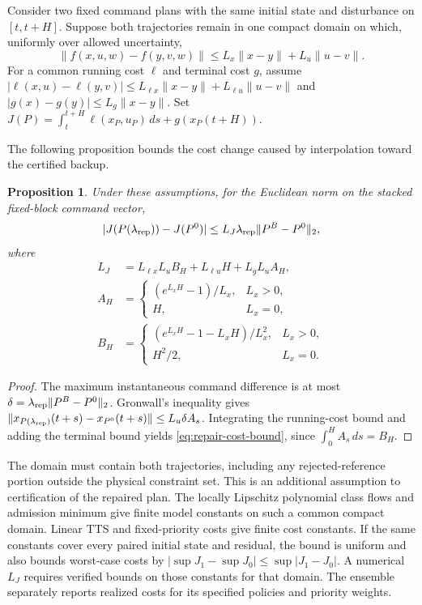 \documentclass[preprint,12pt]{elsarticle}
\newtheorem{proposition}{Proposition}
\begin{document}
Consider two fixed command plans with the same initial state and
disturbance on $[t,t+H]$. Suppose both trajectories remain in one compact
domain on which, uniformly over allowed uncertainty,
\[
\|f(x,u,w)-f(y,v,w)\|
\le L_x\|x-y\|+L_u\|u-v\|.
\]
For a common running cost $\ell$ and terminal cost $g$, assume
$|\ell(x,u)-\ell(y,v)|\le L_{\ell x}\|x-y\|+
L_{\ell u}\|u-v\|$ and $|g(x)-g(y)|\le L_g\|x-y\|$.
Set $J(P)=\int_t^{t+H}\ell(x_P,u_P)\,ds+g(x_P(t+H))$.

The following proposition bounds the cost change caused by interpolation
toward the certified backup.

\begin{proposition}
\label{prop:repair-cost}
Under these assumptions, for the Euclidean norm on the stacked fixed-block
command vector,
\begin{equation}
|J(P(\lambda_{\rm rep}))-J(P^0)|
\le L_J\lambda_{\rm rep}\|P^B-P^0\|_2,
\label{eq:repair-cost-bound}
\end{equation}
where
\begin{align*}
L_J&=L_{\ell x}L_u B_H+L_{\ell u}H+L_gL_u A_H,\\
A_H&=\begin{cases}(e^{L_xH}-1)/L_x,&L_x>0,\\H,&L_x=0,\end{cases}\\
B_H&=\begin{cases}(e^{L_xH}-1-L_xH)/L_x^2,&L_x>0,\\H^2/2,&L_x=0.\end{cases}
\end{align*}
\end{proposition}

\begin{proof}
The maximum instantaneous command difference is at most
$\delta=\lambda_{\rm rep}\|P^B-P^0\|_2$. Gronwall's inequality gives
$\|x_{P(\lambda_{\rm rep})}(t+s)-x_{P^0}(t+s)\|\le L_u\delta A_s$.
Integrating the running-cost bound and adding the terminal bound yields
\eqref{eq:repair-cost-bound}, since $\int_0^H A_s\,ds=B_H$.
\end{proof}

The domain must contain both trajectories, including any rejected-reference
portion outside the physical constraint set. This is an additional
assumption to certification of the repaired plan. The locally Lipschitz
polynomial class flows and admission minimum give finite model constants
on such a common compact domain. Linear TTS and fixed-priority costs give
finite cost constants. If the same constants cover every paired initial
state and residual, the bound is uniform and also bounds worst-case costs
by $|\sup J_1-\sup J_0|\le\sup|J_1-J_0|$. A numerical $L_J$ requires
verified bounds on those constants for that domain. The ensemble separately
reports realized costs for its specified policies and priority weights.
\end{document}
